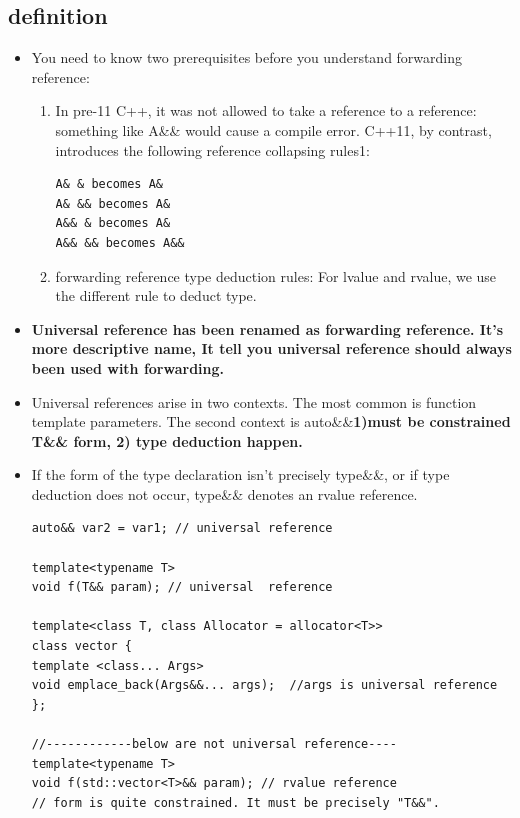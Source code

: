 \documentclass[a4paper,11pt,twoside]{book}
\begin{document}
\subsection{definition}
\begin{itemize}
\item You need to know two prerequisites before you understand forwarding reference:

\begin{enumerate}
	\item In pre-11 C++, it was not allowed to take a reference to a reference: something like A\&\& would cause a compile error. C++11, by contrast, introduces the following reference collapsing rules1:
	
\begin{lstlisting}[numbers=none]
A& & becomes A&
A& && becomes A&
A&& & becomes A&
A&& && becomes A&&
\end{lstlisting}
	
	\item forwarding reference type deduction rules: For lvalue and rvalue, we use the different rule to deduct type.
\end{enumerate}

\item \textbf{Universal reference has been renamed as forwarding reference. It's more descriptive name, It tell you universal reference should always been used with forwarding.}

\item  Universal references arise in two contexts. The most common is function template parameters. The second context is auto\&\&\textbf{1)must be constrained T\&\& form, 2) type deduction happen.}

\item If the form of the type declaration isn't precisely type\&\&, or if type deduction does not occur, type\&\& denotes an rvalue reference.
\begin{lstlisting}[numbers=none]
auto&& var2 = var1; // universal reference

template<typename T>
void f(T&& param); // universal  reference

template<class T, class Allocator = allocator<T>>
class vector {
template <class... Args>
void emplace_back(Args&&... args);  //args is universal reference
};

//------------below are not universal reference----
template<typename T>
void f(std::vector<T>&& param); // rvalue reference
// form is quite constrained. It must be precisely "T&&".


\end{lstlisting}
\end{itemize}
\end{document}
